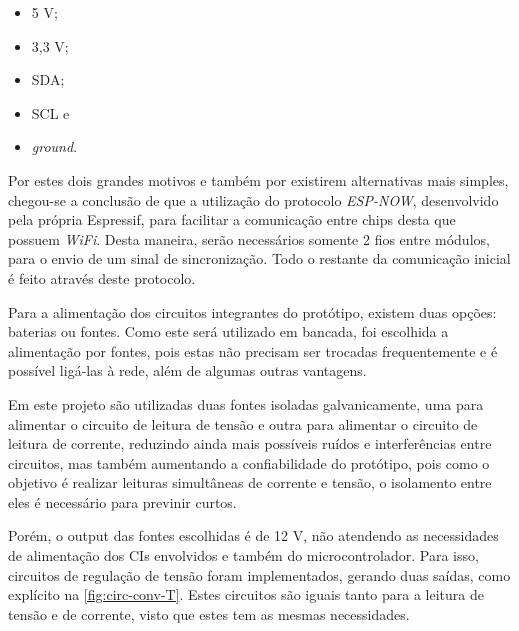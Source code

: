 \begin{itemize}
    \item 5 V;
    \item 3,3 V;
    \item SDA;
    \item SCL e
    \item \textit{ground}.
\end{itemize}

Por estes dois grandes motivos e também por existirem alternativas mais simples, chegou-se a conclusão de que a utilização do protocolo \textit{ESP-NOW}, desenvolvido pela própria Espressif, para facilitar a comunicação entre chips desta que possuem \textit{WiFi}. Desta maneira, serão necessários somente 2 fios entre módulos, para o envio de um sinal de sincronização. Todo o restante da comunicação inicial é feito através deste protocolo.

Para a alimentação dos circuitos integrantes do protótipo, existem duas opções: baterias ou fontes. Como este será utilizado em bancada, foi escolhida a alimentação por fontes, pois estas não precisam ser trocadas frequentemente e é possível ligá-las à rede, além de algumas outras vantagens.

Em este projeto são utilizadas duas fontes isoladas galvanicamente, uma para alimentar o circuito de leitura de tensão e outra para alimentar o circuito de leitura de corrente, reduzindo ainda mais possíveis ruídos e interferências entre circuitos, mas também aumentando a confiabilidade do protótipo, pois como o objetivo é realizar leituras simultâneas de corrente e tensão, o isolamento entre eles é necessário para previnir curtos.

Porém, o output das fontes escolhidas é de 12 V, não atendendo as necessidades de alimentação dos \gls{CI}s envolvidos e também do microcontrolador. Para isso, circuitos de regulação de tensão foram implementados, gerando duas saídas, como explícito na \autoref{fig:circ-conv-T}. Estes circuitos são iguais tanto para a leitura de tensão e de corrente, visto que estes tem as mesmas necessidades.

